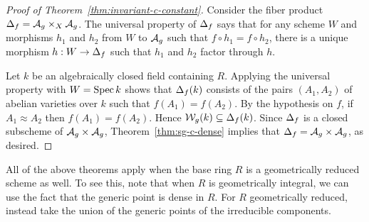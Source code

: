 \documentclass{amsart}
\begin{document}
\begin{proof}[Proof of Theorem~\ref{thm:invariant-c-constant}]
  Consider the fiber product $\Delta_f = \mathcal{A}_g \times_X \mathcal{A}_g$.
  The universal property of $\Delta_f$ says that for any scheme $W$ and morphisms $h_1$ and $h_2$ from $W$ to $\mathcal{A}_g$ such that $f \circ h_1 = f \circ h_2$, there is a unique morphism $h: W \to \Delta_f$ such that $h_1$ and $h_2$ factor through $h$.

  Let $k$ be an algebraically closed field containing $R$.
  Applying the universal property with $W = \operatorname{Spec} k$ shows that $\Delta_f(k)$ consists of the pairs $(A_1,A_2)$ of abelian varieties over $k$ such that $f(A_1) = f(A_2)$.
  By the hypothesis on $f$, if $A_1 \approx A_2$ then $f(A_1) = f(A_2)$. Hence $\mathcal{W}_g(k) \subseteq \Delta_f(k)$.
  Since $\Delta_f$ is a closed subscheme of $\mathcal{A}_g \times \mathcal{A}_g$, Theorem~\ref{thm:sg-c-dense} implies that $\Delta_f = \mathcal{A}_g \times \mathcal{A}_g$, as desired.
\end{proof}

\begin{remark}
  All of the above theorems apply when the base ring $R$ is a geometrically reduced scheme as well. To see this, note that when $R$ is geometrically integral, we can use the fact that the generic point is dense in $R$. For $R$ geometrically reduced, instead take the union of the generic points of the irreducible components.
\end{remark}





\end{document}
